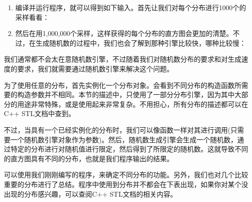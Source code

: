 \begin{enumerate}
\item 编译并运行程序，就可以得到如下输入。首先让我们对每个分布进行1000个的采样看看：


\item 然后在用1,000,000个采样，这样获得的每个分布的直方图会更加的清楚。不过，在生成随机数的过程中，我们也会了解到那种引擎比较快，哪种比较慢：


\end{enumerate}


我们通常都不会太在意随机数引擎，不过随着我们对随机数分布的要求和对生成速度的要求，我们就需要通过随机数引擎来解决这个问题。

为了使用任意的分布，首先实例化一个分布对象。会看到不同分布的构造函数所需要的构造参数并不相同。本节的描述中，只使用了一部分分布引擎，因为其中大部分的用途非常特殊，或是使用起来非常复杂。不用担心，所有分布的描述都可以在C++ STL文档中查到。

不过，当具有一个已经实例化的分布时，我们可以像函数一样对其进行调用(只需要一个随机数引擎对象作为参数)。然后，随机数生成引擎会生成一个随机数，通过特定的分布进行对随机值进行限定，然后得到了所限定的随机数。这就导致不同的直方图具有不同的分布，也就是我们程序输出的结果。

可以使用我们刚刚编写的程序，来确定不同分布的功能。另外，我们也对几个比较重要的分布进行了总结。程序中使用到分布并不都会在下表出现，如果你对某个没出现的分布感兴趣，可以查阅C++ STL文档的相关内容。

